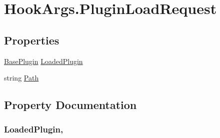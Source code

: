 \hypertarget{structOTA_1_1Plugin_1_1HookArgs_1_1PluginLoadRequest}{}\section{Hook\+Args.\+Plugin\+Load\+Request}
\label{structOTA_1_1Plugin_1_1HookArgs_1_1PluginLoadRequest}
\subsection*{Properties}
\begin{DoxyCompactItemize}
\item 
\hyperlink{classOTA_1_1Plugin_1_1BasePlugin}{Base\+Plugin} \hyperlink{structOTA_1_1Plugin_1_1HookArgs_1_1PluginLoadRequest_ad6fe25dbb51a49eee954925c6576b3a0}{Loaded\+Plugin}
\item 
string \hyperlink{structOTA_1_1Plugin_1_1HookArgs_1_1PluginLoadRequest_af331ba015acf9191899985a835008b9d}{Path}
\end{DoxyCompactItemize}


\subsection{Property Documentation}
\hypertarget{structOTA_1_1Plugin_1_1HookArgs_1_1PluginLoadRequest_ad6fe25dbb51a49eee954925c6576b3a0}{}
\subsubsection[{Loaded\+Plugin}]{ Loaded\+Plugin\hspace{0.3cm}{\ttfamily [get]}, {\ttfamily [set]}}\label{structOTA_1_1Plugin_1_1HookArgs_1_1PluginLoadRequest_ad6fe25dbb51a49eee954925c6576b3a0}
\hypertarget{structOTA_1_1Plugin_1_1HookArgs_1_1PluginLoadRequest_af331ba015acf9191899985a835008b9d}{}
